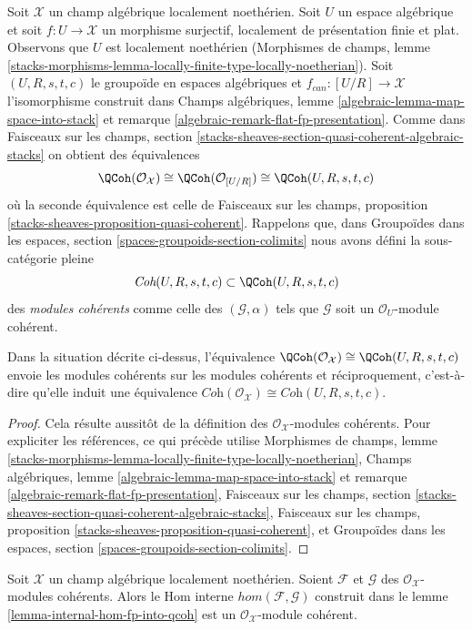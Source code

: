 \noindent
Soit $\mathcal{X}$ un champ algébrique localement noethérien.
Soit $U$ un espace algébrique et soit $f : U \to \mathcal{X}$
un morphisme surjectif, localement de présentation finie et plat.
Observons que $U$ est localement noethérien
(Morphismes de champs, lemme
\ref{stacks-morphisms-lemma-locally-finite-type-locally-noetherian}).
Soit $(U, R, s, t, c)$ le groupoïde en espaces algébriques
et $f_{can} : [U/R] \to \mathcal{X}$ l'isomorphisme
construit dans
Champs algébriques, lemme \ref{algebraic-lemma-map-space-into-stack} et
remarque \ref{algebraic-remark-flat-fp-presentation}.
Comme dans Faisceaux sur les champs, section
\ref{stacks-sheaves-section-quasi-coherent-algebraic-stacks}
on obtient des équivalences
$$
\QCoh(\mathcal{O}_\mathcal{X})
\cong
\QCoh(\mathcal{O}_{[U/R]})
\cong
\QCoh(U, R, s, t, c)
$$
où la seconde équivalence est celle de
Faisceaux sur les champs, proposition \ref{stacks-sheaves-proposition-quasi-coherent}.
Rappelons que, dans Groupoïdes dans les espaces, section
\ref{spaces-groupoids-section-colimits}
nous avons défini la sous-catégorie pleine
$$
\textit{Coh}(U, R, s, t, c) \subset \QCoh(U, R, s, t, c)
$$
des {\it modules cohérents} comme celle des $(\mathcal{G}, \alpha)$ tels que
$\mathcal{G}$ soit un $\mathcal{O}_U$-module cohérent.

\begin{lemma}
\label{lemma-coherent-presentation}
Dans la situation décrite ci-dessus, l'équivalence
$\QCoh(\mathcal{O}_\mathcal{X}) \cong \QCoh(U, R, s, t, c)$
envoie les modules cohérents sur les modules cohérents et réciproquement, c'est-à-dire
qu'elle induit une équivalence
$\textit{Coh}(\mathcal{O}_\mathcal{X}) \cong \textit{Coh}(U, R, s, t, c)$.
\end{lemma}

\begin{proof}
Cela résulte aussitôt de la définition des
$\mathcal{O}_\mathcal{X}$-modules cohérents.
Pour expliciter les références, ce qui précède utilise
Morphismes de champs, lemme
\ref{stacks-morphisms-lemma-locally-finite-type-locally-noetherian},
Champs algébriques, lemme \ref{algebraic-lemma-map-space-into-stack} et
remarque \ref{algebraic-remark-flat-fp-presentation},
Faisceaux sur les champs, section
\ref{stacks-sheaves-section-quasi-coherent-algebraic-stacks},
Faisceaux sur les champs, proposition \ref{stacks-sheaves-proposition-quasi-coherent},
et Groupoïdes dans les espaces, section
\ref{spaces-groupoids-section-colimits}.
\end{proof}

\begin{lemma}
\label{lemma-coherent-hom}
Soit $\mathcal{X}$ un champ algébrique localement noethérien. Soient $\mathcal{F}$
et $\mathcal{G}$ des $\mathcal{O}_\mathcal{X}$-modules cohérents. Alors
le Hom interne $hom(\mathcal{F}, \mathcal{G})$
construit dans le lemme \ref{lemma-internal-hom-fp-into-qcoh}
est un $\mathcal{O}_\mathcal{X}$-module cohérent.
\end{lemma}

